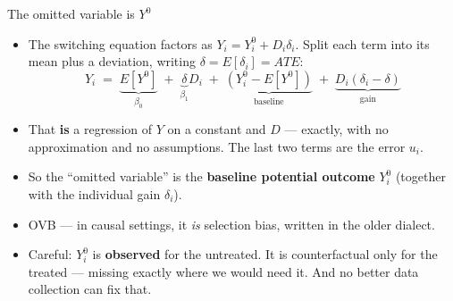 \documentclass[
  11pt,
  ignorenonframetext,
  aspectratio=169,
]{beamer}
\providecommand{\tightlist}{%
  \setlength{\itemsep}{0pt}\setlength{\parskip}{0pt}}
\begin{document}
\begin{frame}{The omitted variable is \(Y^0\)}
\protect{}\label{the-omitted-variable-is-y0}
\begin{itemize}
\tightlist
\item
  The switching equation factors as \(Y_i = Y_i^0 + D_i\delta_i\). Split
  each term into its mean plus a deviation, writing
  \(\delta = E[\delta_i] = ATE\): \[
  Y_i \;=\; \underbrace{E[Y^0]}_{\beta_0}
      \;+\; \underbrace{\delta}_{\beta_1} D_i
      \;+\; \underbrace{\left(Y_i^0 - E[Y^0]\right)}_{\text{baseline}}
      \;+\; \underbrace{D_i(\delta_i - \delta)}_{\text{gain}}
  \]
\item
  That \textbf{is} a regression of \(Y\) on a constant and \(D\) ---
  exactly, with no approximation and no assumptions. The last two terms
  are the error \(u_i\).
\item
  So the ``omitted variable'' is the \textbf{baseline potential outcome}
  \(Y_i^0\) (together with the individual gain \(\delta_i\)).
\item
  OVB --- in causal settings, it \emph{is} selection bias, written in
  the older dialect.
\item
  Careful: \(Y_i^0\) is \textbf{observed} for the untreated. It is
  counterfactual only for the treated --- missing exactly where we would
  need it. And no better data collection can fix that.
\end{itemize}
\end{frame}
\end{document}
